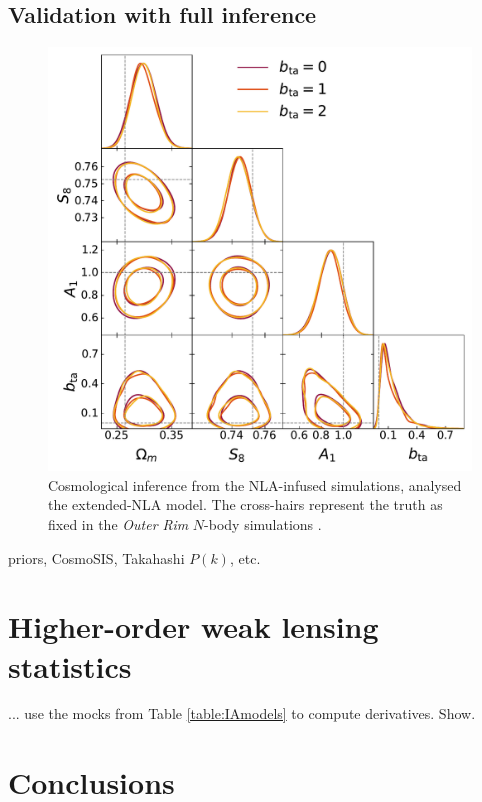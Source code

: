 \documentclass[useAMS,usenatbib]{mn2e}
\begin{document}
\subsection{Validation with full inference}
 \label{sec:inference}
\begin{figure}
\includegraphics[width=\columnwidth]{graphs/triangle_bta_sweep.pdf}
\caption{Cosmological inference from the NLA-infused simulations, analysed the extended-NLA model. The cross-hairs represent the truth as fixed in the {\it Outer Rim} $N$-body simulations \citep{OuterRim}.}
\label{fig:triangle_nla}
\end{figure}
priors, {\sc CosmoSIS}, Takahashi $P(k)$, etc.


\section{Higher-order weak lensing statistics}
\label{sec:HOWLS}

... use the mocks from Table \ref{table:IAmodels} to compute derivatives. Show.


\section{Conclusions}
\label{sec:conclusion}
\end{document}
